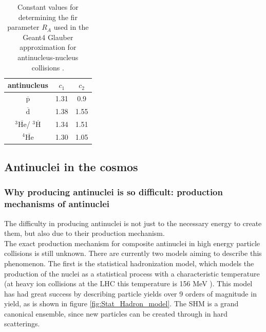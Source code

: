 \begin{table}[]
    \centering
    \begin{tabular}{|c|c|c|}
        \hline
        antinucleus & $c_1$ & $c_2$ \\
        \hline 
        $\overline{\mathrm{p}}$& 1.31& 0.9\\
        \hline
        $\overline{\mathrm{d}}$& 1.38& 1.55\\
        \hline
        $^3\overline{\mathrm{He}}$/ $^3\overline{\mathrm{H}}$& 1.34& 1.51\\
        \hline
        $^4\overline{\mathrm{He}}$& 1.30& 1.05\\
        \hline
    \end{tabular}
    \caption{Constant values for determining the fir parameter $R_A$ used in the Geant4 Glauber approximation for antinucleus-nucleus collisions \cite{Antinucleus-nucleus_Geant4}.}
    \label{tab:antinucleus_nucleus_constants_Glauber}
\end{table}






%
%
\subsection{Antinuclei in the cosmos}

\subsubsection{ Why producing antinuclei is so difficult: production mechanisms of antinuclei}\label{sec:IntroProductionAntinuclei}
The difficulty in producing antinuclei is not just to the necessary energy to create them, but also due to their production mechanism. \\

The exact production mechanism for composite antinuclei in high energy particle collisions is still unknown. There are currently two models aiming to describe this phenomenon. The first is the statistical hadronization model, which models the production of the nuclei as a statistical process with a characteristic temperature (at heavy ion collisions at the LHC this temperature is 156 MeV \cite{4He_PbPb}). This model has had great success by describing particle yields over 9 orders of magnitude in yield, as is shown in figure \ref{fig:Stat_Hadron_model}. The SHM is a grand canonical ensemble, since new particles can be created through in hard scatterings.

